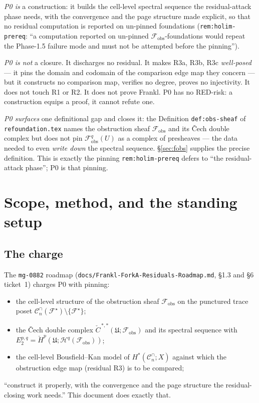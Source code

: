 \documentclass[11pt,oneside]{amsart}
\theoremstyle{plain}
\theoremstyle{definition}
\theoremstyle{remark}
\theoremstyle{honeststyle}
\newcommand{\F}{\mathcal{F}}
\newcommand{\Fstar}{\F^{\star}}
\newcommand{\Cn}{\mathcal{C}^{\cap}_n}
\newcommand{\fobs}{\mathcal{F}_{\mathrm{obs}}}
\newcommand{\Uf}{\mathfrak{U}}
\newcommand{\Ccheck}{\check{C}}
\begin{document}
\noindent\emph{P0 is} a construction: it builds the cell-level
spectral sequence the residual-attack phase needs, with the
convergence and the page structure made explicit, so that no residual
computation is reported on un-pinned foundations
(\texttt{rem:holim-prereq}: ``a computation reported on un-pinned
$\fobs$-foundations would repeat the Phase-1.5 failure mode and must
not be attempted before the pinning'').

\smallskip
\noindent\emph{P0 is not} a closure. It discharges no residual. It
makes R3a, R3b, R3c \emph{well-posed} --- it pins the domain and
codomain of the comparison edge map they concern --- but it constructs
no comparison map, verifies no degree, proves no injectivity. It does
not touch R1 or R2. It does not prove Frankl. P0 has no RED-risk: a
construction equips a proof, it cannot refute one.

\smallskip
\noindent\emph{P0 surfaces} one definitional gap and closes it: the
Definition \texttt{def:obs-sheaf} of \texttt{refoundation.tex} names
the obstruction sheaf $\fobs$ and its \v{C}ech double complex but does
not pin $\fobs^{q}(U)$ as a complex of presheaves --- the data needed
to even \emph{write down} the spectral sequence. \S\ref{sec:fobs}
supplies the precise definition. This is exactly the pinning
\texttt{rem:holim-prereq} defers to ``the residual-attack phase'';
P0 is that pinning.

\section{Scope, method, and the standing setup}
\label{sec:scope}

\subsection{The charge}
\label{ssec:charge}

The \texttt{mg-0882} roadmap (\texttt{docs/Frankl-ForkA-Residuals-Roadmap.md},
\S1.3 and \S6 ticket~1) charges P0 with pinning:
\begin{itemize}[leftmargin=1.7em]
\item the cell-level structure of the obstruction sheaf $\fobs$ on the
  punctured trace poset $\Cn(\Fstar)\setminus\{\Fstar\}$;
\item the \v{C}ech double complex $\Ccheck^{\,*,*}(\Uf;\fobs)$ and its
  spectral sequence with $E_{2}^{p,q}=\check H^{p}(\Uf;\mathcal
  H^{q}(\fobs))$;
\item the cell-level Bousfield--Kan model of $H^{*}(\Cn;X)$ against
  which the obstruction edge map (residual R3) is to be compared;
\end{itemize}
``construct it properly, with the convergence and the page structure
the residual-closing work needs.'' This document does exactly that.
\end{document}
